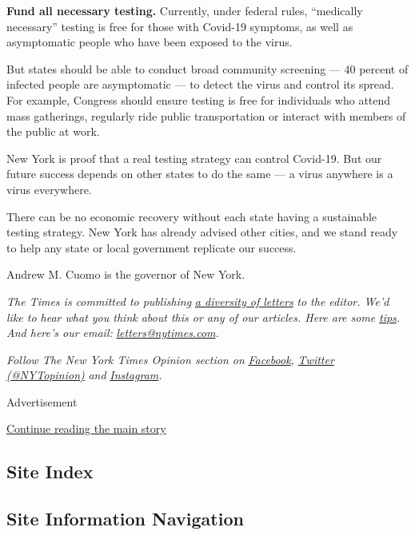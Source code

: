 \textbf{Fund all necessary testing.} Currently, under federal rules,
``medically necessary'' testing is free for those with Covid-19
symptoms, as well as asymptomatic people who have been exposed to the
virus.

But states should be able to conduct broad community screening --- 40
percent of infected people are asymptomatic --- to detect the virus and
control its spread. For example, Congress should ensure testing is free
for individuals who attend mass gatherings, regularly ride public
transportation or interact with members of the public at work.

New York is proof that a real testing strategy can control Covid-19. But
our future success depends on other states to do the same --- a virus
anywhere is a virus everywhere.

There can be no economic recovery without each state having a
sustainable testing strategy. New York has already advised other cities,
and we stand ready to help any state or local government replicate our
success.

Andrew M. Cuomo is the governor of New York.

\emph{The Times is committed to publishing}
\href{https://www.nytimes.com/2019/01/31/opinion/letters/letters-to-editor-new-york-times-women.html}{\emph{a
diversity of letters}} \emph{to the editor. We'd like to hear what you
think about this or any of our articles. Here are some}
\href{https://help.nytimes.com/hc/en-us/articles/115014925288-How-to-submit-a-letter-to-the-editor}{\emph{tips}}\emph{.
And here's our email:}
\href{mailto:letters@nytimes.com}{\emph{letters@nytimes.com}}\emph{.}

\emph{Follow The New York Times Opinion section on}
\href{https://www.facebook.com/nytopinion}{\emph{Facebook}}\emph{,}
\href{http://twitter.com/NYTOpinion}{\emph{Twitter (@NYTopinion)}}
\emph{and}
\href{https://www.instagram.com/nytopinion/}{\emph{Instagram}}\emph{.}

Advertisement

\protect\hyperlink{after-bottom}{Continue reading the main story}

\hypertarget{site-index}{%
\subsection{Site Index}\label{site-index}}

\hypertarget{site-information-navigation}{%
\subsection{Site Information
Navigation}\label{site-information-navigation}}


